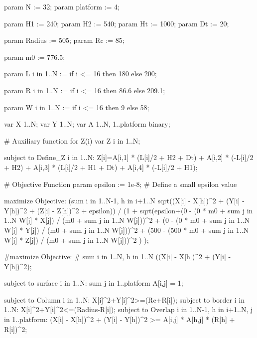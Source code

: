 param N := 32;
param platform := 4;

param H1 := 240;
param H2 := 540;
param Ht := 1000;
param Dt := 20;

param Radius := 505;
param Rc := 85;

param m0 := 776.5;

param L {i in 1..N} :=
    if i <= 16 then 180
    else 200;

param R {i in 1..N} :=
    if i <= 16 then 86.6
    else 209.1;

param W {i in 1..N} :=
    if i <= 16 then 9
    else 58;

var X {1..N};
var Y {1..N};
var A {1..N, 1..platform} binary;

# Auxiliary function for Z(i)
var Z {i in 1..N};

subject to Define_Z {i in 1..N}:
     Z[i]=A[i,1] * (L[i]/2 + H2 + Dt)
         + A[i,2] * (-L[i]/2 + H2)
         + A[i,3] * (L[i]/2 + H1 + Dt)
         + A[i,4] * (-L[i]/2 + H1);

# Objective Function
param epsilon := 1e-8;  # Define a small epsilon value

maximize Objective:
     (sum {i in 1..N-1, h in i+1..N} sqrt((X[i] - X[h])^2 + (Y[i] - Y[h])^2 + (Z[i] - Z[h])^2 + epsilon))
        / (1 + 
            sqrt(epsilon+(0 - (0 * m0 + sum {j in 1..N} W[j] * X[j]) / (m0 + sum {j in 1..N} W[j]))^2
                +
                (0 - (0 * m0 + sum {j in 1..N} W[j] * Y[j]) / (m0 + sum {j in 1..N} W[j]))^2
                +
                (500 - (500 * m0 + sum {j in 1..N} W[j] * Z[j]) / (m0 + sum {j in 1..N} W[j]))^2
            )
        );

#maximize Objective:
#     sum {i in 1..N, h in 1..N} ((X[i] - X[h])^2 + (Y[i] - Y[h])^2);
        

subject to surface {i in 1..N}:
    sum {j in 1..platform} A[i,j] = 1;

subject to Column {i in 1..N}:
   X[i]^2+Y[i]^2>=(Rc+R[i]);
subject to border {i in 1..N}:
   X[i]^2+Y[i]^2<=(Radius-R[i]);
subject to Overlap {i in 1..N-1, h in i+1..N, j in 1..platform}:
   (X[i] - X[h])^2 + (Y[i] - Y[h])^2 >= A[i,j] * A[h,j] * (R[h] + R[i])^2;

